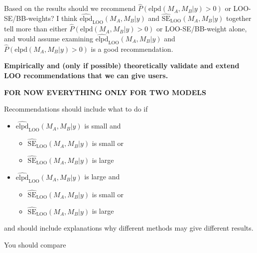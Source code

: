 Based on the results should we recommend
\(\widehat{P}(\mathrm{elpd}(M_A, M_B | y) > 0)\) or LOO-SE/BB-weights? I
think \(\widehat{\mathrm{elpd}}_\mathrm{LOO}(M_A, M_B | y)\) and
\(\widehat{\mathrm{SE}}_\mathrm{LOO}(M_A, M_B | y)\) together tell more
than either \(\widehat{P}(\mathrm{elpd}(M_A, M_B | y) > 0)\) or
LOO-SE/BB-weight alone, and would assume examining
\(\widehat{\mathrm{elpd}}_\mathrm{LOO}(M_A, M_B | y)\) and
\(\widehat{P}(\mathrm{elpd}(M_A, M_B | y) > 0)\) is a good
recommendation.

\textbf{Empirically and (only if possible) theoretically validate and
extend LOO recommendations that we can give users.}

\textbf{FOR NOW EVERYTHING ONLY FOR TWO MODELS}

Recommendations should include what to do if

\begin{itemize}
\tightlist
\item
  \(\widehat{\mathrm{elpd}}_\mathrm{LOO}(M_A, M_B | y)\) is small and

  \begin{itemize}
  \tightlist
  \item
    \(\widehat{\mathrm{SE}}_\mathrm{LOO}(M_A, M_B | y)\) is small or
  \item
    \(\widehat{\mathrm{SE}}_\mathrm{LOO}(M_A, M_B | y)\) is large
  \end{itemize}
\item
  \(\widehat{\mathrm{elpd}}_\mathrm{LOO}(M_A, M_B | y)\) is large and

  \begin{itemize}
  \tightlist
  \item
    \(\widehat{\mathrm{SE}}_\mathrm{LOO}(M_A, M_B | y)\) is small or
  \item
    \(\widehat{\mathrm{SE}}_\mathrm{LOO}(M_A, M_B | y)\) is large
  \end{itemize}
\end{itemize}

and should include explanations why different methods may give different
results.

You should compare

